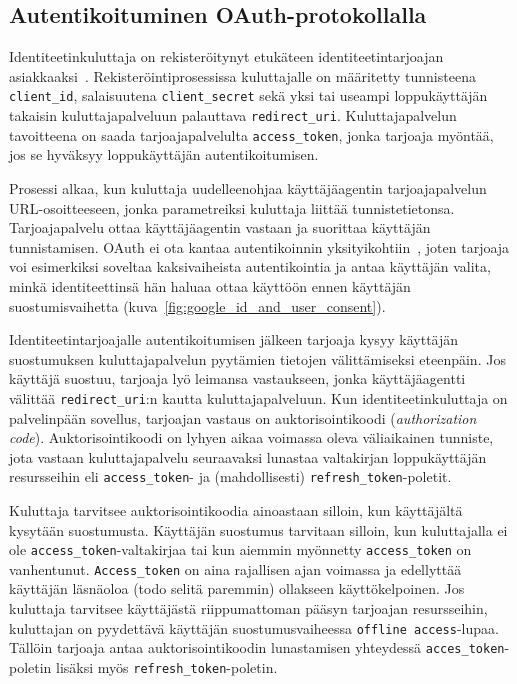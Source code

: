 \documentclass[finnish,gradu]{tktltiki}
\begin{document}


  \subsection{Autentikoituminen OAuth-protokollalla} %
  \label{ssub:autentikoituminen_oauth_protokollalla}

  Identiteetinkuluttaja on rekisteröitynyt etukäteen identiteetintarjoajan asiakkaaksi~\cite{google_oauth2_doc, facebook_oauth2_doc}. Rekisteröintiprosessissa kuluttajalle on määritetty tunnisteena \verb!client_id!, salaisuutena \verb!client_secret! sekä yksi tai useampi loppukäyttäjän takaisin kuluttajapalveluun palauttava \verb!redirect_uri!. Kuluttajapalvelun tavoitteena on saada tarjoajapalvelulta \verb!access_token!, jonka tarjoaja myöntää, jos se hyväksyy loppukäyttäjän autentikoitumisen.

  Prosessi alkaa, kun kuluttaja uudelleenohjaa käyttäjäagentin tarjoajapalvelun URL-osoitteeseen, jonka parametreiksi kuluttaja liittää tunnistetietonsa. Tarjoajapalvelu ottaa käyttäjäagentin vastaan ja suorittaa käyttäjän tunnistamisen. OAuth ei ota kantaa autentikoinnin yksityikohtiin~\cite{ietf_oauth2}, joten tarjoaja voi esimerkiksi soveltaa kaksivaiheista autentikointia ja antaa käyttäjän valita, minkä identiteettinsä hän haluaa ottaa käyttöön ennen käyttäjän suostumisvaihetta (kuva~\ref{fig:google_id_and_user_consent}).

  Identiteetintarjoajalle autentikoitumisen jälkeen tarjoaja kysyy käyttäjän suostumuksen kuluttajapalvelun pyytämien tietojen välittämiseksi eteenpäin. Jos käyttäjä suostuu, tarjoaja lyö leimansa vastaukseen, jonka käyttäjäagentti välittää \verb!redirect_uri!:n kautta kuluttajapalveluun. Kun identiteetinkuluttaja on palvelinpään sovellus, tarjoajan vastaus on auktorisointikoodi (\emph{authorization code}). Auktorisointikoodi on lyhyen aikaa voimassa oleva väliaikainen tunniste, jota vastaan kuluttajapalvelu seuraavaksi lunastaa valtakirjan loppukäyttäjän resursseihin eli \verb!access_token!- ja (mahdollisesti) \verb!refresh_token!-poletit.

  Kuluttaja tarvitsee auktorisointikoodia ainoastaan silloin, kun käyttäjältä kysytään suostumusta. Käyttäjän suostumus tarvitaan silloin, kun kuluttajalla ei ole \verb!access_token!-valtakirjaa tai kun aiemmin myönnetty \verb!access_token! on vanhentunut. \verb!Access_token! on aina rajallisen ajan voimassa ja edellyttää käyttäjän läsnäoloa (todo selitä paremmin) ollakseen käyttökelpoinen. Jos kuluttaja tarvitsee käyttäjästä riippumattoman pääsyn tarjoajan resursseihin, kuluttajan on pyydettävä käyttäjän suostumusvaiheessa \verb!offline access!-lupaa. Tällöin tarjoaja antaa auktorisointikoodin lunastamisen yhteydessä \verb!acces_token!-poletin lisäksi myös \verb!refresh_token!-poletin.
\end{document}
